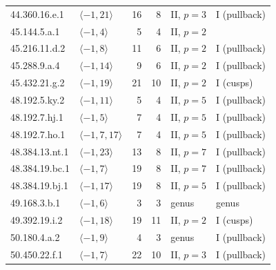 \begin{longtable}{llrrll}
44.360.16.e.1 & $\langle -1,21\rangle$ & 16 & 8 & II, $p=3$ & I (pullback)\\
45.144.5.a.1 & $\langle -1,4\rangle$ & 5 & 4 & II, $p=2$ & \cite{Orlic2025}\\
45.216.11.d.2 & $\langle -1,8\rangle$ & 11 & 6 & II, $p=2$ & I (pullback)\\
45.288.9.a.4 & $\langle -1,14\rangle$ & 9 & 6 & II, $p=2$ & I (pullback)\\
45.432.21.g.2 & $\langle -1,19\rangle$ & 21 & 10 & II, $p=2$ & I (cusps)\\
48.192.5.ky.2 & $\langle -1,11\rangle$ & 5 & 4 & II, $p=5$ & I (pullback)\\
48.192.7.hj.1 & $\langle -1,5\rangle$ & 7 & 4 & II, $p=5$ & I (pullback)\\
48.192.7.ho.1 & $\langle -1,7,17\rangle$ & 7 & 4 & II, $p=5$ & I (pullback)\\
48.384.13.nt.1 & $\langle -1,23\rangle$ & 13 & 8 & II, $p=7$ & I (pullback)\\
48.384.19.bc.1 & $\langle -1,7\rangle$ & 19 & 8 & II, $p=7$ & I (pullback)\\
48.384.19.bj.1 & $\langle -1,17\rangle$ & 19 & 8 & II, $p=5$ & I (pullback)\\
49.168.3.b.1 & $\langle -1,6\rangle$ & 3 & 3 & genus & genus\\
49.392.19.i.2 & $\langle -1,18\rangle$ & 19 & 11 & II, $p=2$ & I (cusps)\\
50.180.4.a.2 & $\langle -1,9\rangle$ & 4 & 3 & genus & I (pullback)\\
50.450.22.f.1 & $\langle -1,7\rangle$ & 22 & 10 & II, $p=3$ & I (pullback)\\
\bottomrule
\end{longtable}
